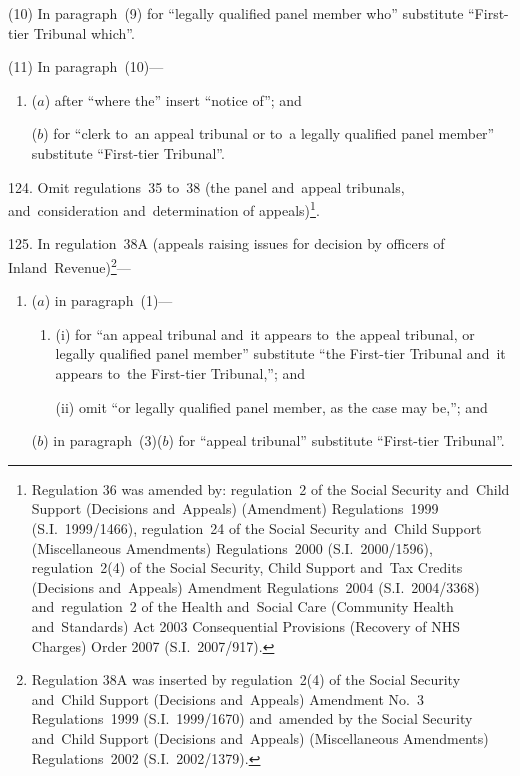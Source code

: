 \documentclass[12pt,a4paper]{article}
\begin{document}
(10) In paragraph~(9) for “legally qualified panel member who” substitute “First-tier Tribunal which”.

(11) In paragraph~(10)—
\begin{enumerate}\item[]
($a$) after “where the” insert “notice of”; and

($b$) for “clerk to~an appeal tribunal or to~a legally qualified panel member” substitute “First-tier Tribunal”.
\end{enumerate}

\medskip

124.  Omit regulations~35 to~38 (the panel and~appeal tribunals, and~consideration and~determination of appeals)\footnote{Regulation 36 was amended by: regulation~2 of the Social Security and~Child Support (Decisions and~Appeals) (Amendment) Regulations~1999 (S.I.~1999/1466), regulation~24 of the Social Security and~Child Support (Miscellaneous Amendments) Regulations~2000 (S.I.~2000/1596), regulation~2(4) of the Social Security, Child Support and~Tax Credits (Decisions and~Appeals) Amendment Regulations~2004 (S.I.~2004/3368) and~regulation~2 of the Health and~Social Care (Community Health and~Standards) Act 2003 Consequential Provisions (Recovery of NHS Charges) Order 2007 (S.I.~2007/917).}.

\medskip

125.  In regulation~38A (appeals raising issues for decision by officers of Inland~Revenue)\footnote{Regulation 38A was inserted by regulation~2(4) of the Social Security and~Child Support (Decisions and~Appeals) Amendment No.~3 Regulations~1999 (S.I.~1999/1670) and~amended by the Social Security and~Child Support (Decisions and~Appeals) (Miscellaneous Amendments) Regulations~2002 (S.I.~2002/1379).}—
\begin{enumerate}\item[]
($a$) in paragraph~(1)—
\begin{enumerate}\item[]
(i) for “an appeal tribunal and~it appears to~the appeal tribunal, or legally qualified panel member” substitute “the First-tier Tribunal and~it appears to~the First-tier Tribunal,”; and

(ii) omit “or legally qualified panel member, as the case may be,”; and
\end{enumerate}

\enlargethispage{-3\baselineskip}

($b$) in paragraph~(3)($b$)  for “appeal tribunal” substitute “First-tier Tribunal”.
\end{enumerate}
\end{document}
